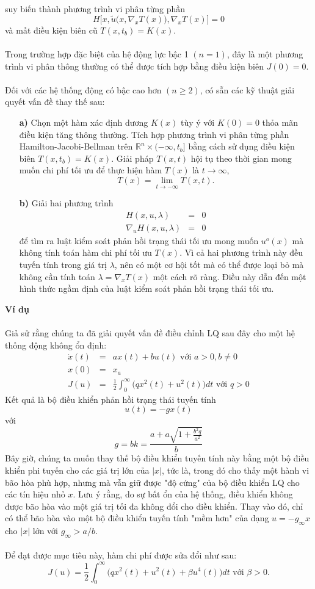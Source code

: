 \documentclass[12pt,a4paper]{report}
\begin{document}
suy biến thành phương trình vi phân từng phần $$H\big[x, \tilde{u}\big(x, \nabla_xT(x)\big), \nabla_xT(x)\big] = 0$$ và mất điều kiện biên cũ $T(x, t_b) = K(x)$.\\\\ Trong trường hợp đặc biệt của hệ động lực bậc 1 $(n = 1)$, đây là một phương trình vi phân thông thường có thể được tích hợp bằng điều kiện biên $J(0) = 0$.
\\\\ Đối với các hệ thống động có bậc cao hơn $(n \geq 2)$, có sẵn các kỹ thuật giải quyết vấn đề thay thế sau:
\begin{itemize}
	\item[\textbf{a)}] Chọn một hàm xác định dương $K(x)$ tùy ý với $K (0) = 0$ thỏa mãn điều kiện tăng thông thường. Tích hợp phương trình vi phân từng phần Hamilton-Jacobi-Bellman trên  $\mathbb{R}^n \times (-\infty, t_b]$ bằng cách sử dụng điều kiện biên $T(x, t_b) = K (x)$. Giải pháp $T(x, t)$ hội tụ theo thời gian mong muốn chi phí tối ưu để thực hiện hàm $T(x)$ là $t \to \infty$, $$T(x) = \lim_{t\to -\infty}T(x, t).$$
	\item[\textbf{b)}] Giải hai phương trình
	\begin{eqnarray}
		H(x, u, \lambda) &=& 0 \nonumber \\ \nabla_uH(x, u, \lambda) &=& 0 \nonumber
	\end{eqnarray} để tìm ra luật kiểm soát phản hồi trạng thái tối ưu mong muốn $u^o(x)$ mà không tính toán hàm chi phí tối ưu $T (x)$. Vì cả hai phương trình này đều tuyến tính trong giá trị $\lambda$, nên có một cơ hội tốt mà có thể được loại bỏ mà không cần tính toán $\lambda = \nabla_xT(x)$ một cách rõ ràng. Điều này dẫn đến một hình thức ngầm định của luật kiểm soát phản hồi trạng thái tối ưu.
\end{itemize}
\textbf{Ví dụ}\\\\ Giả sử rằng chúng ta đã giải quyết vấn đề điều chỉnh LQ sau đây cho một hệ thống động không ổn định: \begin{eqnarray}
	\dot{x}(t) &=& ax(t)+bu(t) \text{ với } a > 0, b \neq 0 \nonumber \\ x(0) &=& x_a \nonumber\\ J(u) &=& \frac{1}{2}\int_{0}^{\infty}\big(qx^2(t) + u^2(t)\big)dt \text{ với } q > 0 \nonumber
\end{eqnarray}
Kết quả là bộ điều khiển phản hồi trạng thái tuyến tính $$u(t) = -gx(t)$$ với $$g = bk = \frac{a + a\sqrt{1+\frac{b^2q}{a^2}}}{b}$$ 
Bây giờ, chúng ta muốn thay thế bộ điều khiển tuyến tính này bằng một bộ điều khiển phi tuyến cho các giá trị lớn của $|x|$, tức là, trong đó cho thấy một hành vi bão hòa phù hợp, nhưng mà vẫn giữ được "độ cứng" của bộ điều khiển LQ cho các tín hiệu nhỏ $x$. Lưu ý rằng, do sự bất ổn của hệ thống, điều khiển không được bão hòa vào một giá trị tối đa không đổi cho điều khiển. Thay vào đó, chỉ có thể bão hòa vào một bộ điều khiển tuyến tính "mềm hơn" của dạng $u = - g_{\infty} x$ cho  $|x|$ lớn với $g _{\infty} > a/b$. \\\\ Để đạt được mục tiêu này, hàm chi phí được sửa đổi như sau: $$J(u) = \frac{1}{2}\int_{0}^{\infty} \big(qx^2(t) + u^2(t) + \beta u^4(t)\big)dt \text{ với } \beta > 0.$$
\end{document}
